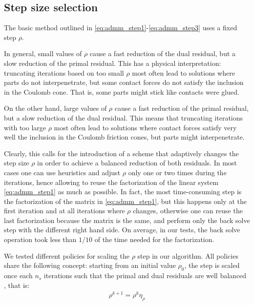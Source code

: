 \documentclass[final,3p]{elsarticle}
\begin{document}
\subsection{Step size selection}

The basic method outlined in \eqref{eq:admm_step1}-\eqref{eq:admm_step3} uses a fixed step $\rho$. 

In general, small values of $\rho$ cause a fast reduction of the dual residual, but a slow reduction of the primal residual. This has a  physical interpretation: truncating iterations based on too small $\rho$ most often lead to solutions where parts do not interpenetrate, but some contact forces do not satisfy the inclusion in the Coulomb cone. That is, some parts might stick like contacts were glued.

On the other hand, large values of $\rho$ cause a fast reduction of the primal residual, but a slow reduction of the dual residual. This means that truncating iterations with too large $\rho$ most often lead to solutions where contact forces satisfy very well the inclusion in the Coulomb friction cones, but parts might interpenetrate.
 
Clearly, this calls for the introduction of a scheme that adaptively changes the step size $\rho$ in order to achieve a balanced reduction of both residuals.
In most cases one can use heuristics and adjust $\rho$ only one or two times during the iterations, hence allowing to reuse the factorization of the linear system \eqref{eq:admm_step1} as much as possible. In fact, the most time-consuming step is the factorization of the matrix in \eqref{eq:admm_step1}, but this happens only at the first iteration and at all iterations where $\rho$ changes, otherwise one can reuse the last factorization because the matrix is the same, and perform only the back solve step with the different right hand side. On average, in our tests, the back solve operation took less than $1/10$ of the time needed for the factorization. 

We tested different policies for scaling the $\rho$ step in our algorithm. 
All policies share the following concept: starting from an initial value $\rho_0$, the step is scaled once each $n_s$ iterations such that the primal and dual residuals are well balanced 
\cite{Wohlberg2017}, %
that is:
\begin{align}
	\rho^{k+1} = \rho^{k} \eta_\rho 
\end{align}
  
\end{document}
